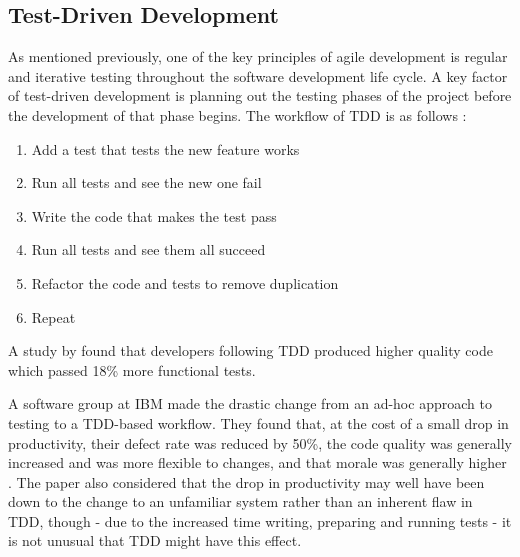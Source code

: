 \subsection{Test-Driven Development}
As mentioned previously, one of the key principles of agile development is regular and iterative testing throughout the software development life cycle.
A key factor of test-driven development is planning out the testing phases of the project before the development of that phase begins.
The workflow of TDD is as follows \citep{Beck:2002:TDD:579193}:
\begin{enumerate}
	\item Add a test that tests the new feature works
	\item Run all tests and see the new one fail
	\item Write the code that makes the test pass
	\item Run all tests and see them all succeed
	\item Refactor the code and tests to remove duplication
	\item Repeat
\end{enumerate}

A study by \cite{George:2003:IIT:952532.952753} found that developers following TDD produced higher quality code which passed 18\% more functional tests.

A software group at IBM made the drastic change from an ad-hoc approach to testing to a TDD-based workflow. They found that, at the cost of a small drop in productivity, their defect rate was reduced by 50\%, the code quality was generally increased and was more flexible to changes, and that morale was generally higher \citep{IBMTDD}. 
The paper also considered that the drop in productivity may well have been down to the change to an unfamiliar system rather than an inherent flaw in TDD, though - due to the increased time writing, preparing and running tests - it is not unusual that TDD might have this effect.